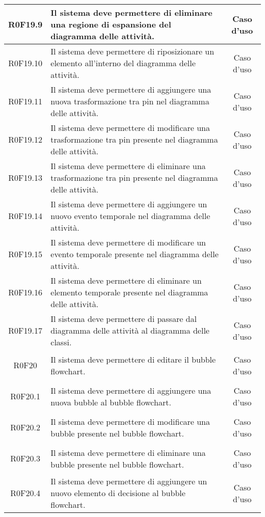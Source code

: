 \documentclass[../AnalisiDeiRequisiti.tex]{subfiles}
\begin{document}
\begin{longtable}{|c|>{\centering}p{7cm}|c|}
\hypertarget{R0F19.9}{R0F19.9} & Il sistema deve permettere di eliminare una regione di espansione del diagramma delle attività. & Caso d'uso \\ \hline
\hypertarget{R0F19.10}{R0F19.10} & Il sistema deve permettere di riposizionare un elemento all'interno del diagramma delle attività. & Caso d'uso \\ \hline
\hypertarget{R0F19.11}{R0F19.11} & Il sistema deve permettere di aggiungere una nuova trasformazione tra pin nel diagramma delle attività. & Caso d'uso \\ \hline
\hypertarget{R0F19.12}{R0F19.12} & Il sistema deve permettere di modificare una trasformazione tra pin presente nel diagramma delle attività. & Caso d'uso \\ \hline
\hypertarget{R0F19.13}{R0F19.13} & Il sistema deve permettere di eliminare una trasformazione tra pin presente nel diagramma delle attività. & Caso d'uso \\ \hline
\hypertarget{R0F19.14}{R0F19.14} & Il sistema deve permettere di aggiungere un nuovo evento temporale nel diagramma delle attività. & Caso d'uso \\ \hline
\hypertarget{R0F19.15}{R0F19.15} & Il sistema deve permettere di modificare un evento temporale presente nel diagramma delle attività. & Caso d'uso \\ \hline
\hypertarget{R0F19.16}{R0F19.16} & Il sistema deve permettere di eliminare un elemento temporale presente nel diagramma delle attività. & Caso d'uso \\ \hline
\hypertarget{R0F19.17}{R0F19.17} & Il sistema deve permettere di passare dal diagramma delle attività al diagramma delle classi. & Caso d'uso \\ \hline
\hypertarget{R0F20}{R0F20} & Il sistema deve permettere di editare il bubble flowchart. & Caso d'uso \\ \hline
\hypertarget{R0F20.1}{R0F20.1} & Il sistema deve permettere di aggiungere una nuova bubble al bubble flowchart. & Caso d'uso \\ \hline
\hypertarget{R0F20.2}{R0F20.2} & Il sistema deve permettere di modificare una bubble presente nel bubble flowchart. & Caso d'uso \\ \hline
\hypertarget{R0F20.3}{R0F20.3} & Il sistema deve permettere di eliminare una bubble presente nel bubble flowchart. & Caso d'uso \\ \hline
\hypertarget{R0F20.4}{R0F20.4} & Il sistema deve permettere di aggiungere un nuovo elemento di decisione al bubble flowchart. & Caso d'uso \\ \hline

\end{longtable}
\end{document}
